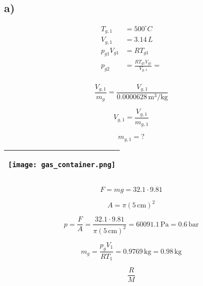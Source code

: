 

\subsection*{a)}

\begin{align*}
T_{g,1} &= 500^\circ C \\
V_{g,1} &= 3.14 \, L \\
p_{g1} V_{g1} &= R T_{g1} \\
p_{g2} &= \frac{R T_{g1} V_{g1}}{V_{g,1}} = \\
\end{align*}

\[
\frac{V_{g,1}}{m_{g}} = \frac{V_{g,1}}{0.0000628 \, \text{m}^3/\text{kg}}
\]

\[
V_{g,1} = \frac{V_{g,1}}{m_{g,1}}
\]

\[
m_{g,1} = ?
\]

\begin{center}
\begin{tabular}{|c|}
\hline
\begin{minipage}{0.2\textwidth}
\begin{center}
\texttt{[image: gas\_container.png]}
\end{center}
\end{minipage} \\
\hline
\end{tabular}
\end{center}

\[
F = m g = 32.1 \cdot 9.81
\]

\[
A = \pi (5 \, \text{cm})^2
\]

\[
p = \frac{F}{A} = \frac{32.1 \cdot 9.81}{\pi (5 \, \text{cm})^2} = 60091.1 \, \text{Pa} = 0.6 \, \text{bar}
\]

\[
m_{g} = \frac{p_{g} V_{1}}{R T_{1}} = 0.9769 \, \text{kg} = 0.98 \, \text{kg}
\]

\[
\frac{R}{M}
\]